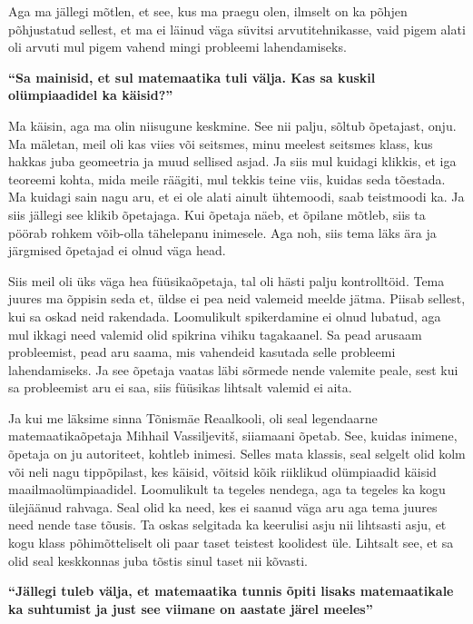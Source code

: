 Aga ma jällegi mõtlen, et see, kus ma praegu olen, ilmselt on ka põhjen
põhjustatud sellest, et ma ei läinud väga süvitsi arvutitehnikasse, vaid pigem
alati oli arvuti mul pigem vahend mingi probleemi lahendamiseks.

\textbf{\enquote{Sa mainisid, et sul matemaatika tuli välja. Kas sa kuskil olümpiaadidel ka käisid?}}

Ma käisin, aga ma olin niisugune keskmine. See nii palju, sõltub õpetajast,
onju. Ma mäletan, meil oli kas viies või seitsmes, minu
meelest seitsmes klass, kus hakkas juba geomeetria ja muud sellised asjad. Ja
siis mul kuidagi klikkis, et iga teoreemi kohta, mida meile räägiti, mul tekkis
teine viis, kuidas seda tõestada. Ma kuidagi sain nagu aru, et ei ole alati
ainult ühtemoodi, saab teistmoodi ka. Ja siis jällegi see klikib õpetajaga. Kui
õpetaja näeb, et õpilane mõtleb, siis ta pöörab rohkem võib-olla tähelepanu
inimesele. Aga noh, siis tema läks ära ja järgmised õpetajad ei olnud väga
head.

Siis meil oli üks väga hea füüsikaõpetaja, tal oli hästi palju kontrolltöid.
Tema juures ma õppisin seda et, üldse ei pea neid valemeid meelde jätma. Piisab
sellest, kui sa oskad neid rakendada. Loomulikult spikerdamine ei olnud
lubatud, aga mul ikkagi need valemid olid spikrina vihiku tagakaanel. Sa pead
arusaam probleemist, pead aru saama, mis vahendeid kasutada selle probleemi
lahendamiseks. Ja see õpetaja vaatas läbi sõrmede nende valemite peale, sest
kui sa probleemist aru ei saa, siis füüsikas lihtsalt valemid ei aita. 

Ja kui me läksime sinna Tõnismäe Reaalkooli, oli seal legendaarne
matemaatikaõpetaja Mihhail Vassiljevitš,
siiamaani õpetab. See, kuidas inimene, õpetaja on ju autoriteet, kohtleb
inimesi. Selles mata klassis, seal selgelt olid kolm või neli nagu tippõpilast,
kes käisid, võitsid kõik riiklikud olümpiaadid käisid maailmaolümpiaadidel.
Loomulikult ta tegeles nendega, aga ta tegeles ka kogu ülejäänud rahvaga. Seal
olid ka need, kes ei saanud väga aru aga tema juures need nende tase tõusis. Ta
oskas selgitada ka keerulisi asju nii lihtsasti asju, et kogu klass
põhimõtteliselt oli paar taset teistest koolidest üle. Lihtsalt see, et sa olid
seal keskkonnas juba tõstis sinul taset nii kõvasti.


\textbf{\enquote{Jällegi tuleb välja, et matemaatika tunnis õpiti lisaks matemaatikale ka suhtumist ja just see viimane on aastate järel meeles}}


